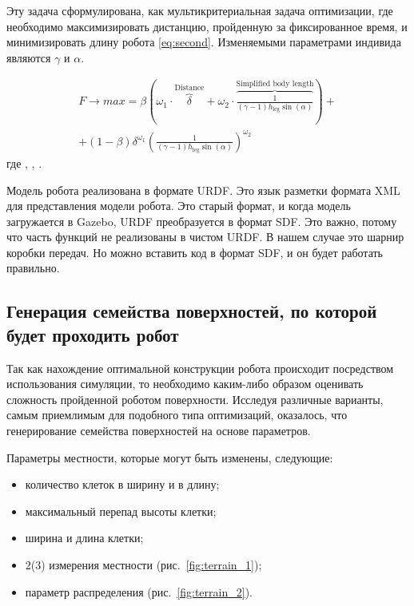 Эту задача сформулирована, как мультикритериальная задача оптимизации, где необходимо максимизировать дистанцию, пройденную за фиксированное время, и минимизировать длину робота \eqref{eq:second}. Изменяемыми параметрами индивида являются  $\gamma$ и $\alpha$.

\begin{align}
    \label{eq:second}
    F \rightarrow max = \beta \left( {\omega}_{1} \cdot \overbrace{\delta}^{\text{Distance}} + {\omega}_{2} \cdot \overbrace{\frac{1}{(\gamma - 1) h_{\text{leg}}\sin(\alpha)}}^{\text{Simplified body length}}\right) + \\ \nonumber + (1 - \beta) {\delta}^{{\omega}_{1}} {\left( \frac{1}{(\gamma - 1)h_{\text{leg}}\sin(\alpha)}\right)}^{{\omega}_{2}}
\end{align}
где , , .


Модель робота реализована в формате URDF. Это язык разметки формата XML для представления модели робота. Это старый формат, и когда модель загружается в Gazebo, URDF преобразуется в формат SDF. Это важно, потому что часть функций не реализованы в чистом URDF. В нашем случае это шарнир коробки передач. Но можно вставить код в формат SDF, и он будет работать правильно.

\subsection{Генерация семейства поверхностей, по которой будет проходить робот}
Так как нахождение оптимальной конструкции робота происходит посредством использования симуляции, то необходимо каким-либо образом оценивать сложность пройденной роботом поверхности. Исследуя различные варианты, самым приемлимым для подобного типа оптимизаций, оказалось, что генерирование семейства поверхностей на основе параметров.

Параметры местности, которые могут быть изменены, следующие:
\begin{itemize}
\item количество клеток в ширину и в длину;
\item максимальный перепад высоты клетки;
\item ширина и длина клетки;
\item 2(3) измерения местности (рис.~\ref{fig:terrain_1});
\item параметр распределения (рис.~\ref{fig:terrain_2}).
\end{itemize}

